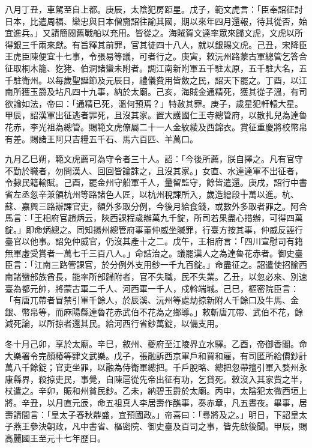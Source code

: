 \begin{pinyinscope}
 八月丁丑，車駕至自上都。庚辰，太陰犯房距星。戊子，範文虎言：「臣奉詔征討日本，比遣周福、欒忠與日本僧齎詔往諭其國，期以來年四月還報，待其從否，始宜進兵。」又請簡閱舊戰船以充用。皆從之。海賊賀文達率眾來歸文虎，文虎以所得銀三千兩來獻。有旨釋其前罪，官其徒四十八人，就以銀賜文虎。己丑，宋降臣王虎臣陳便宜十七事，令張易等議，可者行之。庚寅，敕沅州路蒙古軍總管乞答合征取桐木籠、犵狫、伯洞諸蠻未附者。調江南新附軍五千駐太原，五千駐大名，五千駐衛州。以每歲聖誕節及元辰日，禮儀費用皆斂之民，詔天下罷之。丁酉，以江南所獲玉爵及坫凡四十九事，納於太廟。己亥，海賊金通精死，獲其從子溫，有司欲論如法，帝曰：「通精已死，溫何預焉？」特赦其罪。庚子，歲星犯軒轅大星。甲辰，詔漢軍出征逃者罪死，且沒其家。置大護國仁王寺總管府，以散扎兒為達魯花赤，李光祖為總管。賜範文虎僚屬二十一人金紋綾及西錦衣。賞征重慶將校幣帛有差。賜諸王阿只吉糧五千石、馬六百匹、羊萬口。



 九月乙巳朔，範文虎薦可為守令者三十人。詔：「今後所薦，朕自擇之。凡有官守不勤於職者，勿問漢人、回回皆論誅之，且沒其家。」女直、水達達軍不出征者，令隸民籍輸賦。己酉，罷金州守船軍千人，量留監守，餘皆遣還。庚戌，詔行中書省左丞忽辛兼領杭州等路諸色人匠，以杭州稅課所入，歲造繒段十萬以進。杭、蘇、嘉興三路辦課官吏，額外多取分例，今後月給食錢，或數外多取者罪之。阿合馬言：「王相府官趙炳云，陜西課程歲辦萬九千錠，所司若果盡心措辦，可得四萬錠。」即命炳總之。同知揚州總管府事董仲威坐贓罪，行臺方按其事，仲威反誣行臺官以他事。詔免仲威官，仍沒其產十之二。戊午，王相府言：「四川宣慰司有籍無軍虛受賞者一萬七千三百八人。」命詰治之。議罷漢人之為達魯花赤者。御史臺臣言：「江南三路管課官，於分例外支用鈔一千九百錠。」命盡征之。詔遣使招諭西南諸蠻部族酋長，能率所部歸附者，官不失職，民不失業。乙丑，以忽必來、別速臺為都元帥，將蒙古軍二千人、河西軍一千人，戍斡端城。己巳，樞密院臣言：「有唐兀帶者冒禁引軍千餘人，於辰溪、沅州等處劫掠新附人千餘口及牛馬、金銀、幣帛等，而麻陽縣達魯花赤武伯不花為之鄉導。」敕斬唐兀帶、武伯不花，餘減死論，以所掠者還其民。給河西行省鈔萬錠，以備支用。



 冬十月己卯，享於太廟。辛巳，敘州、夔府至江陵界立水驛。乙酉，帝御香閣。命大樂署令完顏椿等肄文武樂。戊子，張融訴西京軍戶和買和雇，有司匿所給價鈔計萬八千餘錠；官吏坐罪，以融為侍衛軍總把。千戶脫略、總把忽帶擅引軍入婺州永康縣界，殺掠吏民，事覺，自陳扈從先帝出征有功，乞貸死。敕沒入其家貲之半，杖遣之。辛卯，賑和州貧民鈔。乙未，納碧玉爵於太廟。丙申，太陰犯太微西垣上將。辛丑，以月直元辰，命五祖真人李居壽作醮事，奏赤章，凡五晝夜。畢事，居壽請間言：「皇太子春秋鼎盛，宜預國政。」帝喜曰：「尋將及之。」明日，下詔皇太子燕王參決朝政，凡中書省、樞密院、御史臺及百司之事，皆先啟後聞。甲辰，賜高麗國王至元十七年歷日。




\end{pinyinscope}

